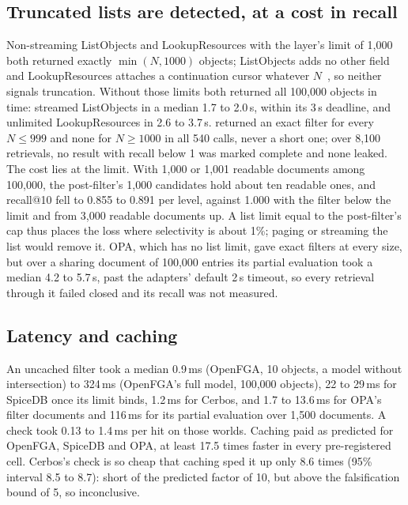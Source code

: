 \subsection{Truncated lists are detected, at a cost in recall}\label{sec:eng-trunc}

Non-streaming ListObjects and LookupResources with the layer's limit of 1,000 both returned exactly
$\min(N, 1000)$ objects; ListObjects adds no other field~\cite{openfga2026openfga} and
LookupResources attaches a continuation cursor whatever $N$~\cite{authzed2026permissionserviceproto}, so neither
signals truncation. Without those limits both returned all 100,000 objects in time: streamed ListObjects in a median 1.7
to 2.0\,s, within its 3\,s deadline, and unlimited LookupResources in 2.6 to 3.7\,s. \sys{} returned
an exact filter for every $N \le 999$ and none for $N \ge 1000$ in all 540 calls, never a short one;
over 8,100 retrievals, no result with recall below 1 was marked complete and none leaked. The cost
lies at the limit. With 1,000 or 1,001 readable documents among 100,000, the post-filter's 1,000
candidates hold about ten readable ones, and recall@10 fell to 0.855 to 0.891 per level, against
1.000 with the filter below the limit and from 3,000 readable documents up. A list limit equal to the
post-filter's cap thus places the loss where selectivity is about 1\%; paging or streaming the list
would remove it. OPA, which has no list limit, gave exact filters at every size, but over a sharing
document of 100,000 entries its partial evaluation took a median 4.2 to 5.7\,s, past the adapters'
default 2\,s timeout, so every retrieval through it failed closed and its recall was not measured.

\subsection{Latency and caching}\label{sec:eng-latency}

An uncached filter took a median 0.9\,ms (OpenFGA, 10 objects, a model without intersection) to
324\,ms (OpenFGA's full model, 100,000 objects), 22 to 29\,ms for SpiceDB once its limit binds,
1.2\,ms for Cerbos, and 1.7 to 13.6\,ms for OPA's filter documents and 116\,ms for its partial
evaluation over 1,500 documents. A check took 0.13 to 1.4\,ms per hit on those worlds. Caching paid as
predicted for OpenFGA, SpiceDB and OPA, at least 17.5 times faster in every pre-registered cell.
Cerbos's check is so cheap that caching sped it up only 8.6 times (95\% interval 8.5 to 8.7): short
of the predicted factor of 10, but above the falsification bound of 5, so inconclusive.

